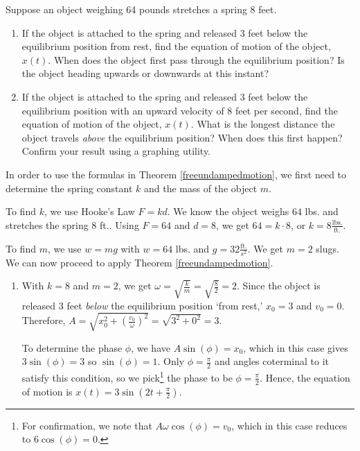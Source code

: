 \documentclass{ximera}
\begin{document}
\begin{example} \label{freeudampedex}  Suppose an object weighing  64 pounds stretches a spring 8 feet.  

\begin{enumerate}

\item  If the object is attached to the spring and released 3 feet below the equilibrium position from rest, find the equation of motion of the object, $x(t)$.  When does the object first pass through the equilibrium position?  Is the object heading upwards or downwards at this instant? 

\item  If the object is attached to the spring and released 3 feet below the equilibrium position with an upward velocity of $8$ feet  per second, find the equation of motion of the object, $x(t)$.  What is the longest distance the object travels \textit{above} the equilibrium position?  When does this first happen? Confirm your result using a graphing utility.

\end{enumerate}

\begin{explanation} In order to use the formulas in Theorem \ref{freeundampedmotion}, we first need to determine the spring constant $k$ and the mass of the object $m$.  

 

To find $k$, we use Hooke's Law $F = kd$.  We know the object weighs $64$ lbs. and stretches the spring $8$ ft.. Using $F = 64$ and $d = 8$,  we get  $64  = k \cdot 8 $, or  $k = 8 \frac{\text{lbs.}}{\text{ft.}}$.  

 

To find $m$, we use $w = mg$ with $w = 64$ lbs. and $g =32 \frac{\text{ft.}}{s^2}$.  We get $m = 2$ slugs.  We can now proceed to apply Theorem \ref{freeundampedmotion}.

\begin{enumerate}

\item  With $k = 8$ and $m = 2$, we get $\omega = \sqrt{\frac{k}{m}} = \sqrt{\frac{8}{2}} = 2$.  Since the object is released 3 feet \textit{below} the equilibrium position `from rest,'    $x_0 = 3$ and  $v_0 = 0$.  Therefore, $A = \sqrt{x_0^2 + \left( \frac{v_0}{\omega}\right)^2} = \sqrt{3^2 + 0^2} = 3$.  

 

 To determine the phase $\phi$, we have $A\sin(\phi) = x_0$, which in this case gives $3 \sin(\phi) = 3$ so $\sin(\phi) = 1$.  Only $\phi = \frac{\pi}{2}$ and angles coterminal to it satisfy this condition, so we pick\footnote{For confirmation, we note that $A\omega\cos(\phi) = v_0$, which in this case reduces to $6\cos(\phi) = 0$.} the phase to be $\phi = \frac{\pi}{2}$.  Hence, the equation of motion is $x(t) = 3\sin\left(2t + \frac{\pi}{2}\right)$.  


\end{enumerate}
\end{explanation}
\end{example}
\end{document}
